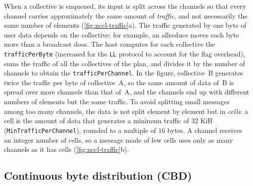 When a collective is enqueued, its input is split across the channels so that every channel carries approximately the same amount of \emph{traffic}, and not necessarily the same number of elements (\cref{fig:nccl-traffic}a).
The traffic generated by one byte of user data depends on the collective: for example, an allreduce moves each byte more than a broadcast does.
The host computes for each collective the \texttt{trafficPerByte} (increased for the \texttt{LL} protocol to account for the flag overhead), sums the traffic of all the collectives of the plan, and divides it by the number of channels to obtain the \texttt{trafficPerChannel}.
In the figure, collective~B generates twice the traffic per byte of collective~A, so the same amount of data of~B is spread over more channels than that of~A, and the channels end up with different numbers of elements but the same traffic.
To avoid splitting small messages among too many channels, the data is not split element by element but in \emph{cells}: a cell is the amount of data that generates a minimum traffic of $32$ KiB (\texttt{MinTrafficPerChannel}), rounded to a multiple of $16$ bytes.
A channel receives an integer number of cells, so a message made of few cells uses only as many channels as it has cells (\cref{fig:nccl-traffic}b).

\subsection{Continuous byte distribution (CBD)}\label{sec:nccl-cbd}

